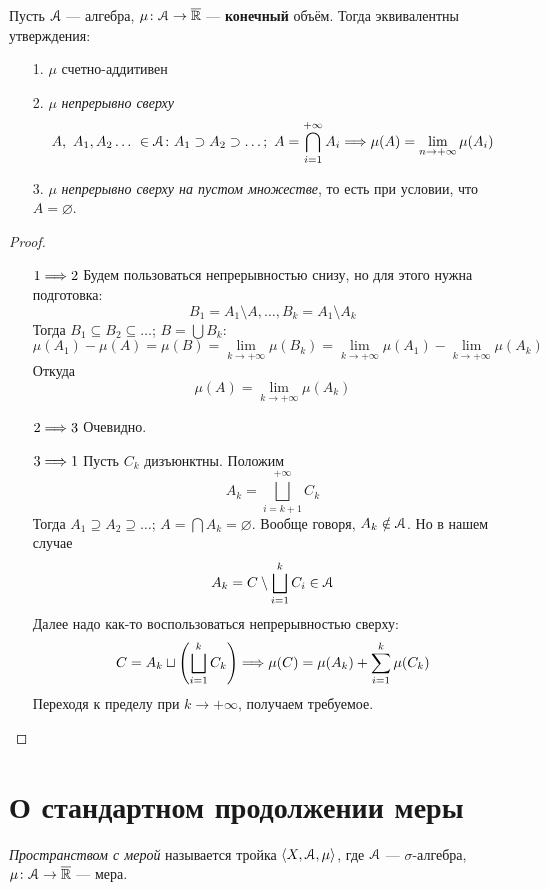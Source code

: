 \begin{theorem}
    Пусть $\mathcal{A}$ --- алгебра, $\mu \colon \mathcal{A} \to \overline{\mathbb{R}}$ --- \textbf{конечный} объём.
    Тогда эквивалентны утверждения:
    \begin{itemize}
        \item[1.] $\mu$ счетно-аддитивен
		\item[2.] $\mu$ \textit{непрерывно сверху}
\[
	A,~A_1, A_2 \ldots~ \in \mathcal{A}\colon A_1 \supset A_2 \supset \ldots;~
    \displaystyle A = \bigcap_{i = 1}^{+\infty}{A_i} \Longrightarrow \\ \mu(A) = \lim_{n \to
    +\infty}{\mu(A_i)}
\]
        \item[3.] $\mu$ \textit{непрерывно сверху на пустом множестве}, то есть
			при условии, что $A = \varnothing$.
    \end{itemize}
\end{theorem}
\begin{proof}
	\enewline
	\begin{itemize}
		\item [$1 \Longrightarrow 2$] Будем пользоваться непрерывностью снизу, но для этого
			нужна подготовка:
\[
	B_1 = A_1 \setminus A, \ldots, B_k = A_1 \setminus A_k
\]
	Тогда $B_1 \subseteq B_2 \subseteq \ldots$; $B = \bigcup{B_k}$:
\[
	\mu(A_1) - \mu(A) = \mu(B) = \lim_{k \to +\infty}{\mu(B_k)}
	= \lim_{k \to +\infty}{\mu(A_1)} - \lim_{k \to +\infty}{\mu(A_k)}
\]
	Откуда
\[
	\mu(A) = \lim_{k \to +\infty}{\mu(A_k)}
\]
		\item[$2 \Longrightarrow 3$] Очевидно.
		\item[$3 \Longrightarrow 1$] Пусть $C_k$ дизъюнктны. Положим
\[
	A_k = \bigsqcup_{i = k+1}^{+\infty}{C_k}
\]
	Тогда $A_1 \supseteq A_2 \supseteq \ldots$; $A = \bigcap{A_k} = \varnothing$.
	Вообще говоря, $A_k \notin \mathcal{A}$. Но в нашем случае
\[
	A_k = C \setminus \bigsqcup_{i = 1}^{k}{C_i} \in \mathcal{A}
\]
	Далее надо как-то воспользоваться непрерывностью сверху:
\[
	C = A_k \sqcup \left(\bigsqcup_{i = 1}^{k}{C_k}\right)
	\Longrightarrow \mu(C) = \mu(A_k) + \sum_{i = 1}^{k}{\mu(C_k)}
\]
	Переходя к пределу при $k \to +\infty$, получаем требуемое.
	\end{itemize}
\end{proof}

\section{О стандартном продолжении меры}

\begin{definition}
    \textit{Пространством с мерой} называется тройка $\langle X, \mathcal{A}, \mu \rangle$,
    где $\mathcal{A}$ --- $\sigma$-алгебра, $\mu \colon \mathcal{A} \to \overline{\mathbb{R}}$ --- мера.
\end{definition}

